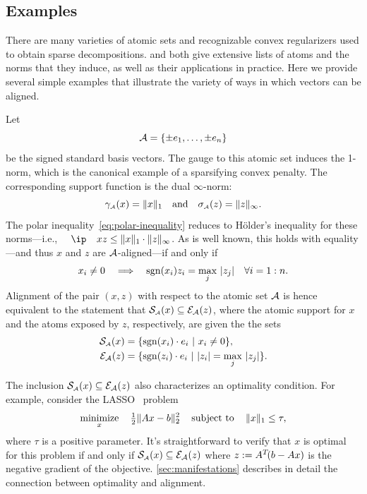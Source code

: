 \subsection{Examples}

There are many varieties of atomic sets and recognizable convex
regularizers used to obtain sparse decompositions.
\citet{chandrasekaran2012convex} and
\citet{jaggi2013revisiting} both give extensive lists of atoms
and the norms that they induce, as well as their applications in practice.
Here we provide several simple examples that illustrate the variety of
ways in which vectors can be aligned.

\begin{example} \label{example-one-norm} Let
    \[\mathcal{A} = \{\pm e_1,\ldots,\pm e_n\}\] be the signed standard basis vectors.
    The gauge to this atomic set induces the 1-norm, which is the canonical
    example of a sparsifying convex penalty. The corresponding support function is
    the dual $\infty$-norm:
    \[
      \gamma_{\scriptscriptstyle\mathcal{A}}(x) = \|x\|_1 \hbox{\quad and\quad} \sigma_{\scriptscriptstyle\mathcal{A}}(z) = \|z\|_\infty.
    \]
    The polar inequality~\eqref{eq:polar-inequality} reduces to
    H\"older's inequality for these norms---i.e.,
    $\ip x z \le \|x\|_1\cdot\|z\|_\infty$. As is well known, this holds
    with equality---and thus $x$ and $z$ are $\mathcal{A}$-aligned---if and only
    if
  \begin{equation*}
    x_i \neq 0
    \quad\Longrightarrow\quad
    \operatorname{sgn}(x_i) z_i = \max_j\,|z_j| \quad \forall i=1:n.
  \end{equation*}
  Alignment of the pair $(x,z)$ with respect to the atomic set $\mathcal{A}$ is hence
  equivalent to the statement that $\operatorname{\mathcal{S}_{\scriptscriptstyle\mathcal{A}}}(x)\subseteq\mathcal{E}_{\mathcal{A}}(z)$, where the
  atomic support for $x$ and the atoms exposed by $z$, respectively, are given the
  the sets
  \begin{align*}
    \operatorname{\mathcal{S}_{\scriptscriptstyle\mathcal{A}}}(x) &= \{\operatorname{sgn}(x_i)\cdot e_i ~|~ x_i \neq 0\},
  \\\mathcal{E}_{\mathcal{A}}(z) &= \{\operatorname{sgn}(z_i)\cdot e_i ~|~ |z_i| =  \max_j\,|z_j| \}.
  \end{align*}
  
  The inclusion $\operatorname{\mathcal{S}_{\scriptscriptstyle\mathcal{A}}}(x)\subseteq\mathcal{E}_{\mathcal{A}}(z)$ also characterizes an
  optimality condition. For example, consider the LASSO~\cite{tibshirani1997lasso}
  problem
  \begin{equation*}
    \displaystyle\mathop{\hbox{\rm minimize}}_{x}\enspace\enspace {\textstyle{\frac{1}{2}}}\|Ax-b\|_2^2 \enspace\enspace\mathop{\hbox{\rm subject to}}\enspace\enspace\|x\|_1\le\tau,
  \end{equation*}
  where $\tau$ is a positive parameter. It's straightforward to verify that
  $x$ is optimal for this problem if and only if
  $\operatorname{\mathcal{S}_{\scriptscriptstyle\mathcal{A}}}(x)\subseteq\mathcal{E}_{\mathcal{A}}(z)$ where $z:=A^T\!(b-Ax)$ is the negative gradient
  of the objective. \autoref{sec:manifestations} describes in detail the
  connection between optimality and alignment.
  \end{example}

